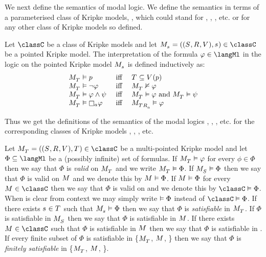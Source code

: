 We next define the semantics of modal logic.
We define the semantics in terms of a parameterised class of Kripke models, \classC{}, which could stand for \classK{}, \classKF{}, \classKFF{}, etc. or for any other class of Kripke models so defined.

\begin{definition}\label{modal-semantics}
Let $\classC$ be a class of Kripke models and let $\pointedModelAndTuple{\stateS} \in \classC$ be a pointed Kripke model.
The interpretation of the formula $\phi \in \langMl$ in the logic \logicC{} on the pointed Kripke model $\pointedModel{\stateS}$ is defined inductively as:
$$
\begin{array}{lcl}
\pointedModel{\statesT} \entails \atomP & \text{ iff } & \statesT \subseteq \valuation(\atomP)\\
\pointedModel{\statesT} \entails \lnot \phi & \text{ iff } & \pointedModel{\statesT} \nentails \phi\\
\pointedModel{\statesT} \entails \phi \land \psi & \text{ iff } & \pointedModel{\statesT} \entails \phi \text{ and } \pointedModel{\statesT} \entails \psi\\
\pointedModel{\statesT} \entails \necessary[\agentA] \phi & \text{ iff } & \pointedModel{\successors{\agentA}{\statesT}} \entails \phi
\end{array}
$$
\end{definition}

Thus we get the definitions of the semantics of the modal logics \logicK{}, \logicKF{}, \logicKFF{}, etc. for the corresponding classes of Kripke models \classK{}, \classKF{}, \classKFF{}, etc.

Let $\pointedModelAndTuple{\statesT} \in \classC$ be a multi-pointed Kripke model and
let $\Phi \subseteq \langMl$ be a (possibly infinite) set of formulas.
If $\pointedModel{\statesT} \entails \phi$ for every $\phi \in \Phi$ then we say that $\Phi$ is {\em valid} on $\pointedModel{\statesT}$ and we write $\pointedModel{\statesT} \entails \Phi$.
If $\pointedModel{\states} \entails \Phi$ then we say that $\Phi$ is valid on $\model$ and we denote this by $\model \entails \Phi$.
If $\model \entails \Phi$ for every $\model \in \classC$ then we say that $\Phi$ is valid on \classC{} and we denote this by $\classC \entails \Phi$.
When \classC{} is clear from context we may simply write $\vDash \Phi$ instead of $\classC \entails \Phi$.
If there exists $\stateS \in \statesT$ such that $\pointedModel{\stateS} \entails \Phi$ then we say that $\Phi$ is {\em satisfiable} in $\pointedModel{\statesT}$.
If $\Phi$ is satisfiable in $\pointedModel{\states}$ then we say that $\Phi$ is satisfiable in $\model$.
If there exists $\model \in \classC$ such that $\Phi$ is satisfiable in $\model$ then we say that $\Phi$ is satisfiable in \classC{}.
If every finite subset of $\Phi$ is satisfiable in \{$\pointedModel{\statesT}$, $\model$, \classC{}\} then we say that $\Phi$ is {\em finitely satisfiable} in \{$\pointedModel{\statesT}$, $\model$, \classC{}\}.

